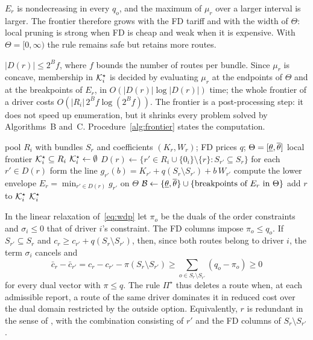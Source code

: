\begin{remark}[Monotonicity]
\label{rem:monotone}
$E_r$ is nondecreasing in every $q_o$, and the maximum of $\mu_r$ over a
larger interval is larger. The frontier therefore grows with the FD tariff
and with the width of $\Theta$: local pruning is strong when FD is cheap and
weak when it is expensive. With $\Theta=[0,\infty)$ the rule remains safe but
retains more routes.
\end{remark}

\begin{remark}[Computation]
\label{rem:computation}
$|D(r)|\le 2^Bf$, where $f$ bounds the number of routes per bundle. Since
$\mu_r$ is concave, membership in $\mathcal{K}^\star_i$ is decided by evaluating $\mu_r$
at the endpoints of $\Theta$ and at the breakpoints of $E_r$, in
$O(|D(r)|\log|D(r)|)$ time; the whole frontier of a driver costs
$O(|R_i|\,2^Bf\log(2^Bf))$. The frontier is a post-processing step: it does
not speed up enumeration, but it shrinks every problem solved by
Algorithms~B and~C. Procedure~\ref{alg:frontier} states the computation.
\end{remark}

\begin{algorithm}[!htbp]
\caption{\textsc{Frontier}$(R_i,q,\Theta)$: the rule $\Pi^\star$ for one driver}
\label{alg:frontier}
\begin{algorithmic}[1]
\Require pool $R_i$ with bundles $S_r$ and coefficients $(K_r,W_r)$; FD prices $q$; $\Theta=[\underline{\theta},\overline{\theta}]$
\Ensure local frontier $\mathcal{K}^\star_i\subseteq R_i$
\State $\mathcal{K}^\star_i\gets\emptyset$
  \State $D(r)\gets\{r'\in R_i\cup\{0_i\}\setminus\{r\}:S_{r'}\subseteq S_r\}$
  \State for each $r'\in D(r)$ form the line $g_{r'}(b)=K_{r'}+q(S_r\setminus S_{r'})+b\,W_{r'}$
  \State compute the lower envelope $E_r=\min_{r'\in D(r)}g_{r'}$ on $\Theta$ 
  \State $\mathcal B\gets\{\underline{\theta},\overline{\theta}\}\cup\{\text{breakpoints of }E_r\text{ in }\Theta\}$
   
    \State add $r$ to $\mathcal{K}^\star_i$
  \EndIf
\EndFor
\State \Return $\mathcal{K}^\star_i$
\end{algorithmic}
\end{algorithm}

\begin{remark}
\label{rem:lp}
In the linear relaxation of~\eqref{eq:wdp} let $\pi_o$ be the duals of the
order constraints and $\sigma_i\le 0$ that of driver $i$'s constraint. The FD
columns impose $\pi_o\le q_o$. If $S_{r'}\subseteq S_r$ and
$c_r\ge c_{r'}+q(S_r\setminus S_{r'})$, then, since both routes belong to
driver $i$, the term $\sigma_i$ cancels and
\[
\bar c_r-\bar c_{r'}=c_r-c_{r'}-\pi(S_r\setminus S_{r'})
\ge\sum_{o\in S_r\setminus S_{r'}}(q_o-\pi_o)\ge 0
\]
for every dual vector with $\pi\le q$. The rule $\Pi^\star$ thus deletes a
route when, at each admissible report, a route of the same driver dominates
it in reduced cost over the dual domain restricted by the outside option.
Equivalently, $r$ is redundant in the sense of \citet{sol1994column}, with
the combination consisting of $r'$ and the FD columns of
$S_r\setminus S_{r'}$.
\end{remark}

